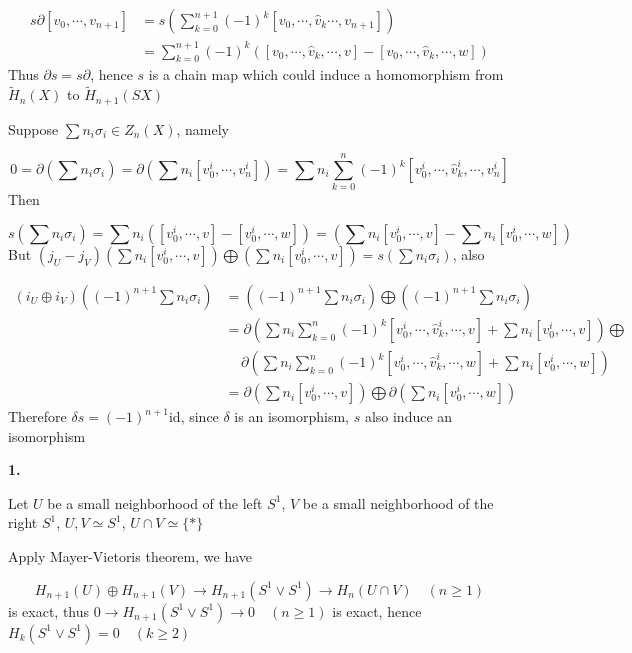 \documentclass[../main.tex]{subfiles}
\begin{document}
\[
\begin{aligned}
s\partial[v_0,\cdots,v_{n+1}]
&=s\left(\sum_{k=0}^{n+1}(-1)^k[v_0,\cdots,\hat{v}_k\cdots,v_{n+1}]\right) \\
&=\sum_{k=0}^{n+1}(-1)^k\left([v_0,\cdots,\hat{v}_k,\cdots,v]-[v_0,\cdots,\hat{v}_k,\cdots,w]\right)
\end{aligned}
\]
Thus $\partial s=s\partial$, hence $s$ is a chain map which could induce a homomorphism from $\tilde{H}_n(X)$ to $\tilde{H}_{n+1}(SX)$ \par
Suppose $\sum n_i\sigma_i\in Z_{n}(X)$, namely \par
\[
0=\partial\left(\sum n_i\sigma_i\right)=\partial\left(\sum n_i[v^i_0,\cdots,v^i_n]\right)=\sum n_i\sum_{k=0}^n(-1)^k[v^i_0,\cdots,\hat{v}^i_k,\cdots,v^i_n]
\]
Then \par
$$s\left(\sum n_i\sigma_i\right)=\sum n_i\left([v^i_0,\cdots,v]-[v^i_0,\cdots,w]\right)=\left(\sum n_i[v^i_0,\cdots,v]-\sum n_i[v^i_0,\cdots,w]\right)$$
But $(j_U-j_V)\left(\sum n_i[v^i_0,\cdots,v]\right)\bigoplus\left(\sum n_i[v^i_0,\cdots,v]\right)=s\left(\sum n_i\sigma_i\right)$, also \par
\[
\begin{aligned}
(i_U\oplus i_V)\left((-1)^{n+1}\sum n_i\sigma_i\right)
&=\left((-1)^{n+1}\sum n_i\sigma_i\right)\bigoplus\left((-1)^{n+1}\sum n_i\sigma_i\right) \\
&=\partial\left(\sum n_i\sum_{k=0}^n(-1)^k[v^i_0,\cdots,\hat{v}^i_k,\cdots,v]+\sum n_i[v^i_0,\cdots,v]\right)\bigoplus \\
&\,\quad\partial\left(\sum n_i\sum_{k=0}^n(-1)^k[v^i_0,\cdots,\hat{v}^i_k,\cdots,w]+\sum n_i[v^i_0,\cdots,w]\right) \\
&=\partial\left(\sum n_i[v^i_0,\cdots,v]\right)\bigoplus\partial\left(\sum n_i[v^i_0,\cdots,w]\right)
\end{aligned}
\]
Therefore $\delta s=(-1)^{n+1}\mathrm{id}$, since $\delta$ is an isomorphism, $s$ also induce an isomorphism \par 
\textbf{1.} \par
Let $U$ be a small neighborhood of the left $S^1$, $V$ be a small neighborhood of the right $S^1$, $U,V\simeq S^1$, $U\cap V\simeq\{*\}$ \par
Apply Mayer-Vietoris theorem, we have \par
\[
H_{n+1}(U)\oplus H_{n+1}(V)\rightarrow H_{n+1}(S^1\vee S^1)\rightarrow H_n(U\cap V) \quad (n\geq 1)
\]
is exact, thus $0\rightarrow H_{n+1}(S^1\vee S^1)\rightarrow 0 \quad (n\geq 1)$ is exact, hence $H_k(S^1\vee S^1)=0 \quad (k\geq 2)$
\end{document}
